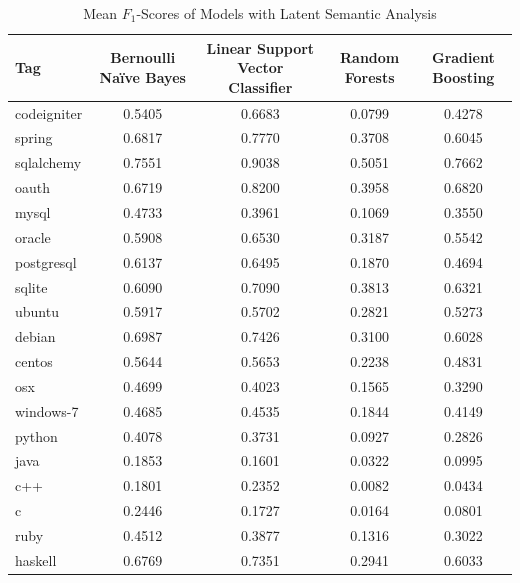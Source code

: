 \documentclass{sig-alternate}
\begin{document}
\begin{table}[ht!]
	\centering
	\begin{tabular}{|l|c|c|c|c|}
		\hline
		\textbf{Tag} & \textbf{Bernoulli Na\"{i}ve Bayes} & \textbf{Linear Support Vector Classifier} & \textbf{Random Forests} & \textbf{Gradient Boosting} \\\hline
		codeigniter	& 0.5405	& 0.6683	& 0.0799	& 0.4278 \\\hline
		spring		& 0.6817	& 0.7770	& 0.3708	& 0.6045 \\\hline
		sqlalchemy	& 0.7551	& 0.9038	& 0.5051	& 0.7662 \\\hline
		oauth		& 0.6719	& 0.8200	& 0.3958	& 0.6820 \\\hline
		mysql		& 0.4733	& 0.3961	& 0.1069	& 0.3550 \\\hline
		oracle		& 0.5908	& 0.6530	& 0.3187	& 0.5542 \\\hline
		postgresql	& 0.6137	& 0.6495	& 0.1870	& 0.4694 \\\hline
		sqlite		& 0.6090	& 0.7090	& 0.3813	& 0.6321 \\\hline
		ubuntu		& 0.5917	& 0.5702	& 0.2821	& 0.5273 \\\hline
		debian		& 0.6987	& 0.7426	& 0.3100	& 0.6028 \\\hline
		centos		& 0.5644	& 0.5653	& 0.2238	& 0.4831 \\\hline
		osx			& 0.4699	& 0.4023	& 0.1565	& 0.3290 \\\hline
		windows-7	& 0.4685	& 0.4535	& 0.1844	& 0.4149 \\\hline
		python		& 0.4078	& 0.3731	& 0.0927	& 0.2826 \\\hline
		java		& 0.1853	& 0.1601	& 0.0322	& 0.0995 \\\hline
		c++			& 0.1801	& 0.2352	& 0.0082	& 0.0434 \\\hline
		c			& 0.2446	& 0.1727	& 0.0164	& 0.0801 \\\hline
		ruby		& 0.4512	& 0.3877	& 0.1316	& 0.3022 \\\hline
		haskell		& 0.6769	& 0.7351	& 0.2941	& 0.6033 \\\hline
	\end{tabular}
	\caption{Mean $F_1$-Scores of Models with Latent Semantic Analysis}
	\label{tab:lsa_model_scores}
\end{table}
\end{document}

